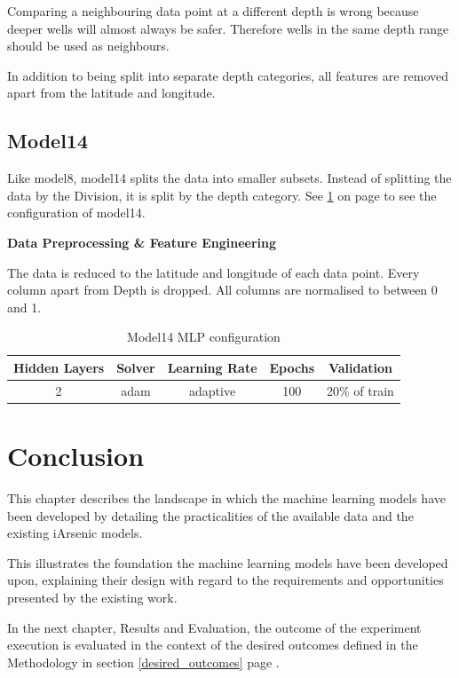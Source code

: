 Comparing a neighbouring data point at a different depth is wrong because deeper wells will almost always be safer. Therefore wells in the same depth range should be used as neighbours.

In addition to being split into separate depth categories, all features are removed apart from the latitude and longitude.

\subsection{Model14}

Like model8, model14 splits the data into smaller subsets. Instead of splitting the data by the Division, it is split by the depth category. See \ref{tbl:x m14_config} on page \pageref{tbl:x m14_config} to see the configuration of model14.

\textbf{Data Preprocessing \& Feature Engineering}

The data is reduced to the latitude and longitude of each data point. Every column apart from Depth is dropped. All columns are normalised to between 0 and 1.

\begin{table}
    \centering
    \begin{tabular}{c c c c c} 
         \toprule
         Hidden Layers & Solver & Learning Rate & Epochs & Validation \\ [0.5ex] 
         \midrule
         2 & adam & adaptive & 100 & 20\% of train\\ 
         \bottomrule
    \end{tabular}
    \caption{Model14 MLP configuration}
    \label{tbl:x m14_config}
\end{table}

\section{Conclusion}

This chapter describes the landscape in which the machine learning models have been developed by detailing the practicalities of the available data and the existing iArsenic models.

This illustrates the foundation the machine learning models have been developed upon, explaining their design with regard to the requirements and opportunities presented by the existing work.

In the next chapter, Results and Evaluation, the outcome of the experiment execution is evaluated in the context of the desired outcomes defined in the Methodology in section \ref{desired_outcomes} page \pageref{desired_outcomes}. 